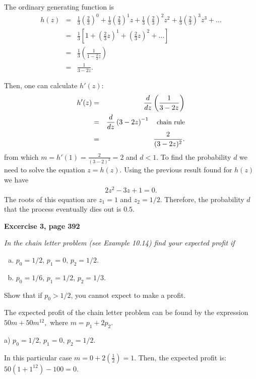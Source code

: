 \documentclass[12pt]{article}
\begin{document}
	The ordinary generating function is 
	\begin{eqnarray*}
		h(z) &=&\frac{1}{3} \left(\frac{2}{3}\right)^{0} + \frac{1}{3} \left(\frac{2}{3}\right)^1 z + \frac{1}{3} \left(\frac{2}{3}\right)^2 z^2 + \frac{1}{3} \left(\frac{2}{3}\right)^3 z^3 + \ldots \\
		&=& \frac{1}{3} \left[1 + \left(\frac{2}{3}z\right)^1 + \left(\frac{2}{3}z\right)^2 + \ldots\right] \\
		&=& \frac{1}{3} \left(\frac{1}{1 - \frac{2}{3} z}\right)\\
		&=& \frac{1}{3 - 2z}.
	\end{eqnarray*}

	Then, one can calculate $h'(z)$:
	\begin{eqnarray*}
		h'(z) &=& \frac{d}{dz} \left( \frac{1}{3 - 2z} \right) \\
		&=& \frac{d}{dz} \left( 3 - 2z \right)^{-1} \quad \text{\small chain rule}\\
		&=& \frac{2}{(3 - 2z)^2}.
		\end{eqnarray*}
	from which $m = h'(1) = \frac{2}{(3 - 2)^2} = 2$ and $d < 1$. To find the probability $d$ we need to solve the equation $z = h(z)$. Using the previous result found for $h(z)$ we have
	\begin{eqnarray*}
	2z^2 - 3z + 1 = 0.
	\end{eqnarray*}
	The roots of this equation are $z_1 = 1$ and $z_2 = 1/2$. Therefore, the probability $d$ that the process eventually dies out is $0.5$. 

	
	{\bf Excercise 3, page 392}
	
	{\em In the chain letter problem (see Example 10.14) find your expected profit if {\setlength{\parskip}{0cm}
			\begin{enumerate}[a)]
				\item $p_0 = 1/2, \, p_1 = 0, \, p_2 = 1/2$.
				\item $p_0 = 1/6, \, p_1 = 1/2, \, p_2 = 1/3$.
			\end{enumerate}
			Show that if $p_0 > 1 / 2$, you cannot expect to make a profit.}
	}
	
	The expected profit of the chain letter problem can be found by the expression $50m + 50 m^{12},$ where $m = p_1 + 2p_2$.
	
	\noindent a) $p_0 = 1/2, \, p_1 = 0, \, p_2 = 1/2$.

	In this particular case $m = 0 + 2\left(\frac{1}{2}\right) = 1$. Then, the expected profit is: $50(1+1^{12})-100 =0$.
\end{document}
